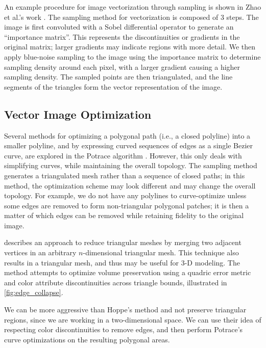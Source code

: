 An example procedure for image vectorization through sampling is shown in Zhao et al.'s work . The sampling method for vectorization is composed of 3 steps. The image is first convoluted with a Sobel differential operator to generate an ``importance matrix''. This represents the discontinuities or gradients in the original matrix; larger gradients may indicate regions with more detail. We then apply blue-noise sampling to the image using the importance matrix to determine sampling density around each pixel, with a larger gradient causing a higher sampling density. The sampled points are then triangulated, and the line segments of the triangles form the vector representation of the image. 

\subsection{Vector Image Optimization}

Several methods for optimizing a polygonal path (i.e., a closed polyline) into a smaller polyline, and by expressing curved sequences of edges as a single Bezier curve, are explored in the Potrace algorithm \cite{selinger2003potrace}. However, this only deals with simplifying curves, while maintaining the overall topology. The sampling method generates a triangulated mesh rather than a sequence of closed paths; in this method, the optimization scheme may look different and may change the overall topology. For example, we do not have any polylines to curve-optimize unless some edges are removed to form non-triangular polygonal patches; it is then a matter of which edges can be removed while retaining fidelity to the original image.

 describes an approach to reduce triangular meshes by merging two adjacent vertices in an arbitrary $n$-dimensional triangular mesh. This technique also results in a triangular mesh, and thus may be useful for 3-D modeling. The method attempts to optimize volume preservation using a quadric error metric and color attribute discontinuities across triangle bounds, illustrated in \cref{fig:edge_collapse}. 

We can be more aggressive than Hoppe's method and not preserve triangular regions, since we are working in a two-dimensional space. We can use their idea of respecting color discontinuities to remove edges, and then perform Potrace's curve optimizations on the resulting polygonal areas.


